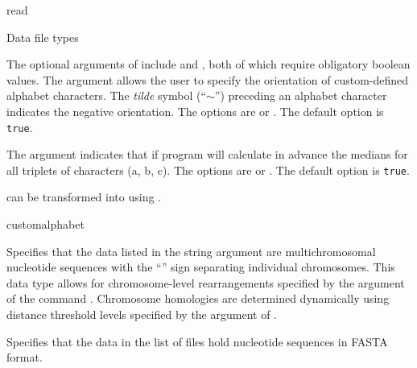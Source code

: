 \begin{command}{read}{}
\begin{arguments}
\begin{argumentgroup}{Data file types}
{	The optional arguments of  include 
	and , both of which require obligatory boolean values. The argument
	 allows the user to specify the orientation of custom-defined alphabet
	characters. The \emph{tilde} symbol (``$\sim$'') preceding an alphabet character indicates
	the negative orientation. The options are 
	or . The default option is \texttt{true}.
	
	The argument  indicates that if program will calculate in advance
	the medians for all triplets of characters (a, b, c). The options are  or
	. The default option is \texttt{true}.
	
	can be transformed into  using .}
	 {customalphabet}
        
            {Specifies that the data listed in the string argument are
            multichromosomal nucleotide sequences with the ``\atsymbol'' sign 
            separating individual chromosomes. This data type
            allows for chromosome-level rearrangements specified by
            the argument
             of the command
            . Chromosome
            homologies are determined dynamically using distance
            threshold levels specified by the argument
            of .} 
            {}
            
            {Specifies that the data in the list of files hold nucleotide
            sequences in FASTA format.} 
            {}

	\end{argumentgroup}
		
	\end{arguments}


	\begin{poyexamples}
	

\end{poyexamples}
\end{command}
